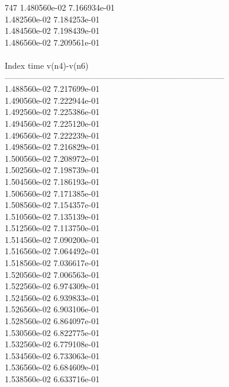 747	1.480560e-02	7.166934e-01	\\ 	1.482560e-02	7.184253e-01	\\ 	1.484560e-02	7.198439e-01	\\ 	1.486560e-02	7.209561e-01	\\ \hline
\\ \hline
Index   time            v(n4)-v(n6)     \\ \hline
--------------------------------------------------------------------------------\\ 	1.488560e-02	7.217699e-01	\\ 	1.490560e-02	7.222944e-01	\\ 	1.492560e-02	7.225386e-01	\\ 	1.494560e-02	7.225120e-01	\\ 	1.496560e-02	7.222239e-01	\\ 	1.498560e-02	7.216829e-01	\\ 	1.500560e-02	7.208972e-01	\\ 	1.502560e-02	7.198739e-01	\\ 	1.504560e-02	7.186193e-01	\\ 	1.506560e-02	7.171385e-01	\\ 	1.508560e-02	7.154357e-01	\\ 	1.510560e-02	7.135139e-01	\\ 	1.512560e-02	7.113750e-01	\\ 	1.514560e-02	7.090200e-01	\\ 	1.516560e-02	7.064492e-01	\\ 	1.518560e-02	7.036617e-01	\\ 	1.520560e-02	7.006563e-01	\\ 	1.522560e-02	6.974309e-01	\\ 	1.524560e-02	6.939833e-01	\\ 	1.526560e-02	6.903106e-01	\\ 	1.528560e-02	6.864097e-01	\\ 	1.530560e-02	6.822775e-01	\\ 	1.532560e-02	6.779108e-01	\\ 	1.534560e-02	6.733063e-01	\\ 	1.536560e-02	6.684609e-01	\\ 	1.538560e-02	6.633716e-01	\\ \hline
